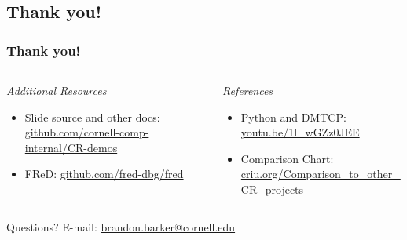 \documentclass[compress]{beamer}
\begin{document}
\subsection{Thank you!}
\begin{frame}
\frametitle{Thank you!} 

\begin{columns}[t]
%
\begin{column}{0.5\textwidth}
\ul{\textit{Additional Resources}}
\begin{itemize}
\item Slide source and other docs: \url{github.com/cornell-comp-internal/CR-demos}
\item FReD: \url{github.com/fred-dbg/fred}
\end{itemize}
\end{column}

\begin{column}{0.5\textwidth}
\ul{\textit{References}}
\begin{itemize}
\item Python and DMTCP: \url{youtu.be/1l_wGZz0JEE}
\item Comparison Chart: \url{criu.org/Comparison_to_other_CR_projects}
\end{itemize}

\vspace{0.4in}


\end{column}

%
\end{columns}

\vspace{0.4in}
Questions? E-mail: \url{brandon.barker@cornell.edu}
\end{frame}

  


\end{document}
